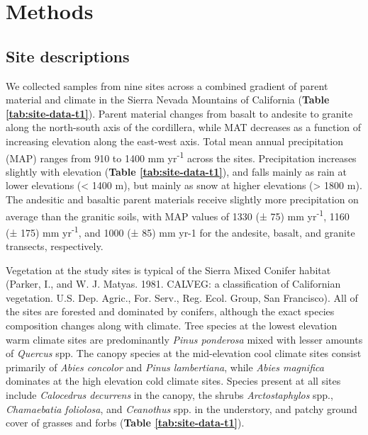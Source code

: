 \documentclass[english,man,floatsintext]{apa6}
\begin{document}
\hypertarget{methods}{%
\section{Methods}\label{methods}}

\hypertarget{site-descriptions}{%
\subsection{Site descriptions}\label{site-descriptions}}

We collected samples from nine sites across a combined gradient of parent material and climate in the Sierra Nevada Mountains of California (\textbf{Table \ref{tab:site-data-t1}}). Parent material changes from basalt to andesite to granite along the north-south axis of the cordillera, while MAT decreases as a function of increasing elevation along the east-west axis. Total mean annual precipitation (MAP) ranges from 910 to 1400 mm yr\textsuperscript{-1} across the sites. Precipitation increases slightly with elevation (\textbf{Table \ref{tab:site-data-t1}}), and falls mainly as rain at lower elevations (\textless{} 1400 m), but mainly as snow at higher elevations (\textgreater{} 1800 m). The andesitic and basaltic parent materials receive slightly more precipitation on average than the granitic soils, with MAP values of 1330 (± 75) mm yr\textsuperscript{-1}, 1160 (± 175) mm yr\textsuperscript{-1}, and 1000 (± 85) mm yr-1 for the andesite, basalt, and granite transects, respectively.

Vegetation at the study sites is typical of the Sierra Mixed Conifer habitat (Parker, I., and W. J. Matyas. 1981. CALVEG: a classification of Californian vegetation. U.S. Dep. Agric., For. Serv., Reg. Ecol. Group, San Francisco). All of the sites are forested and dominated by conifers, although the exact species composition changes along with climate. Tree species at the lowest elevation warm climate sites are predominantly \emph{Pinus ponderosa} mixed with lesser amounts of \emph{Quercus} spp. The canopy species at the mid-elevation cool climate sites consist primarily of \emph{Abies concolor} and \emph{Pinus lambertiana}, while \emph{Abies magnifica} dominates at the high elevation cold climate sites. Species present at all sites include \emph{Calocedrus decurrens} in the canopy, the shrubs \emph{Arctostaphylos} spp., \emph{Chamaebatia foliolosa}, and \emph{Ceanothus} spp. in the understory, and patchy ground cover of grasses and forbs (\textbf{Table \ref{tab:site-data-t1}}).
\end{document}
